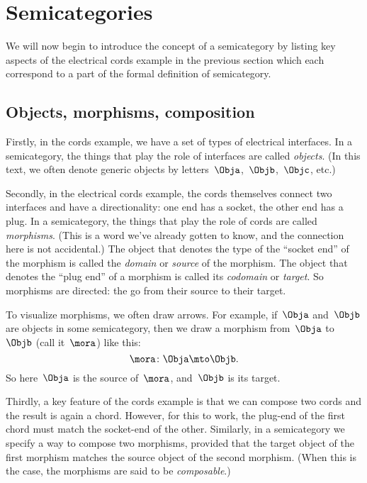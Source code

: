 
\section[Semicategories]{Semicategories}
\label{sec:formal-def-semicat}


We will now begin to introduce the concept of a semicategory by listing key aspects of the electrical cords example in the previous section which each correspond to a part of the formal definition of semicategory.

\subsection{Objects, morphisms, composition}

Firstly, in the cords example, we have a set of types of electrical interfaces.
In a semicategory, the things that play the role of interfaces are called \emph{objects}.
(In this text, we often denote generic objects by letters~$\Obja$,~$\Objb$,~$\Objc$, etc.)

Secondly, in the electrical cords example, the cords themselves connect two interfaces and have a directionality: one end has a socket, the other end has a plug.
In a semicategory, the things that play the role of cords are called \emph{morphisms}.
(This is a word we've already gotten to know, and the connection here is not accidental.) The object that denotes the type of the ``socket end'' of the morphism is called the \emph{domain} or \emph{source} of the morphism.
The object that denotes the ``plug end'' of a morphism is called its \emph{codomain} or \emph{target}.
So morphisms are directed: the go from their source to their target.

To visualize morphisms, we often draw arrows.
For example, if~$\Obja$ and~$\Objb$ are objects in some semicategory, then we draw a morphism from~$\Obja$ to~$\Objb$ (call it~$\mora$) like this:
\begin{equation}
    \mora\colon \Obja \mto \Objb.
\end{equation}
So here~$\Obja$ is the source of~$\mora$, and~$\Objb$ is its target.

Thirdly, a key feature of the cords example is that we can compose two cords and the result is again a chord.
However, for this to work, the plug-end of the first chord must match the socket-end of the other.
Similarly, in a semicategory we specify a way to compose two morphisms, provided that the target object of the first morphism matches the source object of the second morphism.
(When this is the case, the morphisms are said to be \emph{composable}.)

